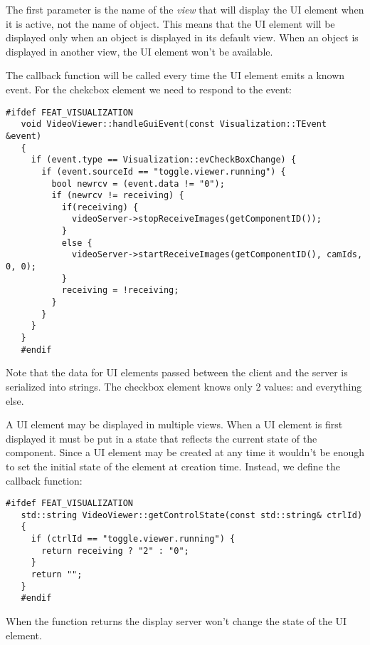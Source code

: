 The first parameter is the name of the {\em view} that will display the UI
element when it is active, not the name of object. This means that the UI
element will be displayed only when an object is displayed in its default view.
When an object is displayed in another view, the UI element won't be available.

The  callback function will be called every time the
UI element emits a known event. For the chekcbox element we need to respond
to the  event:

\begin{Verbatim}[fontsize=\scriptsize,gobble=3]
   #ifdef FEAT_VISUALIZATION
   void VideoViewer::handleGuiEvent(const Visualization::TEvent &event)
   {
     if (event.type == Visualization::evCheckBoxChange) {
       if (event.sourceId == "toggle.viewer.running") {
         bool newrcv = (event.data != "0");
         if (newrcv != receiving) {
           if(receiving) {
             videoServer->stopReceiveImages(getComponentID());
           }
           else {
             videoServer->startReceiveImages(getComponentID(), camIds, 0, 0);
           }
           receiving = !receiving;
         }
       }
     }
   }
   #endif
\end{Verbatim}

Note that the data for UI elements passed between the client and the server is
serialized into strings. The checkbox element knows only 2 values: 
and everything else.

A UI element may be displayed in multiple views. When a UI element is first
displayed it must be put in a state that reflects the current state of the
component.  Since a UI element may be created at any time it wouldn't be enough
to set the initial state of the element at creation time. Instead, we define
the  callback function:

\begin{Verbatim}[fontsize=\scriptsize,gobble=3]
   #ifdef FEAT_VISUALIZATION
   std::string VideoViewer::getControlState(const std::string& ctrlId)
   {
     if (ctrlId == "toggle.viewer.running") {
       return receiving ? "2" : "0";
     }
     return "";
   }
   #endif
\end{Verbatim}

When the function returns  the display server won't change the state
of the UI element.

